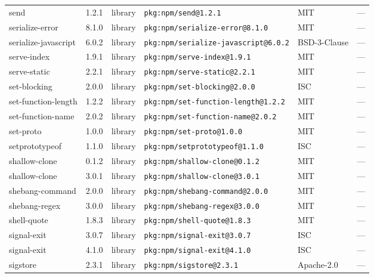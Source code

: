 \documentclass[11pt,a4paper]{article}
\begin{document}
\begin{longtable}{|p{4cm}|p{2cm}|p{1.6cm}|p{5cm}|p{1.5cm}|p{3.5cm}|}
\raggedright send & 1.2.1 & library & \small\texttt{pkg:npm/send@1.2.1} & MIT & \small — \\
\raggedright serialize-error & 8.1.0 & library & \small\texttt{pkg:npm/serialize-error@8.1.0} & MIT & \small — \\
\raggedright serialize-javascript & 6.0.2 & library & \small\texttt{pkg:npm/serialize-javascript@6.0.2} & BSD-3-Clause & \small — \\
\raggedright serve-index & 1.9.1 & library & \small\texttt{pkg:npm/serve-index@1.9.1} & MIT & \small — \\
\raggedright serve-static & 2.2.1 & library & \small\texttt{pkg:npm/serve-static@2.2.1} & MIT & \small — \\
\raggedright set-blocking & 2.0.0 & library & \small\texttt{pkg:npm/set-blocking@2.0.0} & ISC & \small — \\
\raggedright set-function-length & 1.2.2 & library & \small\texttt{pkg:npm/set-function-length@1.2.2} & MIT & \small — \\
\raggedright set-function-name & 2.0.2 & library & \small\texttt{pkg:npm/set-function-name@2.0.2} & MIT & \small — \\
\raggedright set-proto & 1.0.0 & library & \small\texttt{pkg:npm/set-proto@1.0.0} & MIT & \small — \\
\raggedright setprototypeof & 1.1.0 & library & \small\texttt{pkg:npm/setprototypeof@1.1.0} & ISC & \small — \\
\raggedright shallow-clone & 0.1.2 & library & \small\texttt{pkg:npm/shallow-clone@0.1.2} & MIT & \small — \\
\raggedright shallow-clone & 3.0.1 & library & \small\texttt{pkg:npm/shallow-clone@3.0.1} & MIT & \small — \\
\raggedright shebang-command & 2.0.0 & library & \small\texttt{pkg:npm/shebang-command@2.0.0} & MIT & \small — \\
\raggedright shebang-regex & 3.0.0 & library & \small\texttt{pkg:npm/shebang-regex@3.0.0} & MIT & \small — \\
\raggedright shell-quote & 1.8.3 & library & \small\texttt{pkg:npm/shell-quote@1.8.3} & MIT & \small — \\
\raggedright signal-exit & 3.0.7 & library & \small\texttt{pkg:npm/signal-exit@3.0.7} & ISC & \small — \\
\raggedright signal-exit & 4.1.0 & library & \small\texttt{pkg:npm/signal-exit@4.1.0} & ISC & \small — \\
\raggedright sigstore & 2.3.1 & library & \small\texttt{pkg:npm/sigstore@2.3.1} & Apache-2.0 & \small — \\

\end{longtable}
\end{document}
